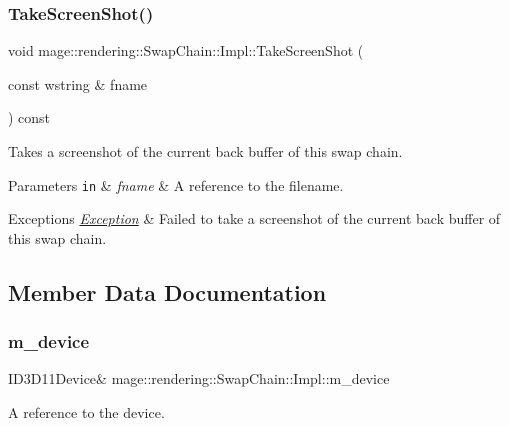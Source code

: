 \subsubsection{\texorpdfstring{Take\+Screen\+Shot()}{TakeScreenShot()}}
{\footnotesize\ttfamily void mage\+::rendering\+::\+Swap\+Chain\+::\+Impl\+::\+Take\+Screen\+Shot (\begin{DoxyParamCaption}\item[{const wstring \&}]{fname }\end{DoxyParamCaption}) const}

Takes a screenshot of the current back buffer of this swap chain.


\begin{DoxyParams}[1]{Parameters}
\mbox{\tt in}  & {\em fname} & A reference to the filename. \\
\hline
\end{DoxyParams}

\begin{DoxyExceptions}{Exceptions}
{\em \mbox{\hyperlink{classmage_1_1_exception}{Exception}}} & Failed to take a screenshot of the current back buffer of this swap chain. \\
\hline
\end{DoxyExceptions}


\subsection{Member Data Documentation}
\mbox{\label{classmage_1_1rendering_1_1_swap_chain_1_1_impl_a6eff2673925babbd6dd9226dd07bf941}} 
\subsubsection{\texorpdfstring{m\+\_\+device}{m\_device}}
{\footnotesize\ttfamily I\+D3\+D11\+Device\& mage\+::rendering\+::\+Swap\+Chain\+::\+Impl\+::m\+\_\+device\hspace{0.3cm}{\ttfamily [private]}}

A reference to the device. \mbox{\label{classmage_1_1rendering_1_1_swap_chain_1_1_impl_aead0bec9edcee29c39a264dc9ea43780}} 
